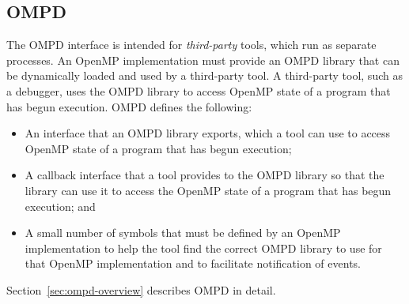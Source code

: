 \subsection{OMPD}

The OMPD interface is intended for \emph{third-party} tools, which run as
separate processes. An OpenMP implementation must provide an OMPD
library that can be dynamically loaded and used by a third-party tool.
A third-party tool, such as a debugger, uses the OMPD library to access
OpenMP state of a program that has begun execution. OMPD defines the following:

\begin{itemize}
\item An interface that an OMPD library exports, which a tool can use 
      to access OpenMP state of a program that has begun execution;
\item A callback interface that a tool provides to the OMPD library so 
      that the library can use it to access the OpenMP state of a program 
      that has begun execution; and
\item A small number of symbols that must be defined by an OpenMP 
      implementation to help the tool find the correct OMPD library to use 
      for that OpenMP implementation and to facilitate notification of events.
\end{itemize}
Section~\ref{sec:ompd-overview} describes OMPD in detail.

